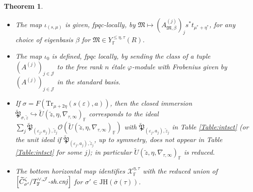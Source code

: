 \documentclass[oneside,a4paper,english, 11pt]{amsart}
\theoremstyle{plain}
\newtheorem{thm}{Theorem}[subsection]
\theoremstyle{plain}
\theoremstyle{plain}
\theoremstyle{plain}
\theoremstyle{plain}
\theoremstyle{plain}
\theoremstyle{definition}
\theoremstyle{definition}
\theoremstyle{definition}
\theoremstyle{remark}
\numberwithin{equation}{section}
\newcommand{\F}{\mathbb{F}}
\newcommand{\fM}{\mathfrak{M}}
\newcommand{\fP}{\mathfrak{P}}
\newcommand{\cJ}{\mathcal{J}}
\newcommand{\cO}{\mathcal{O}}
\newcommand{\cX}{\mathcal{X}}
\newcommand{\eps}{\varepsilon}
\newcommand{\phz}{\varphi}
\newcommand{\Tr}{\mathrm{Tr}}
\newcommand{\tld}[1]{\widetilde{#1}}
\newcommand{\JH}{\mathrm{JH}}
\newcommand{\ovl}[1]{\overline{#1}}
\newcommand{\into}{\hookrightarrow}
\begin{document}
\begin{thm}
\begin{itemize}
\[ (A^{(j)})_j \mapsto  (A^{(j)})_js^*t_{\mu^*+\eta^*}\] 
and is a locally closed immersion.
\item
The map $\iota_{(s,\mu)}$ is given, fpqc-locally, by $\fM\mapsto (A^{(j)}_{\fM,\beta})_js^*t_{\mu^*+\eta^*}$, for any choice of eigenbasis $\beta$ for $\fM\in Y^{\leq\eta,\tau}_\F(R)$.
\item
The map $\iota_0$ is defined, fpqc locally, by sending the class of a tuple $(A^{(j)})_{j\in\cJ}$ to the free rank $n$ \'etale $\phz$-module with Frobenius given by $(A^{(j)})_{j\in\cJ}$ in the standard basis.
\item
If $\sigma = F(\Tr_{\mu+2\eta}(s(\eps),a))$, then the closed immersion $\tld{\fP}_{\sigma,\tld{z}}\into \tld{U}(\tld{z},\eta,\nabla_{\tau,\infty})_{\F}$ corresponds to the ideal $\sum_j \tld{\fP}_{(\eps_j,a_j),\tld{z}_j}\cO(\tld{U}(\tld{z},\eta,\nabla_{\tau,\infty})_{\F})$ with $\tld{\fP}_{(\eps_j,a_j),\tld{z}_j}$ in Table \ref{Table:intsct} (or the unit ideal if $\tld{\fP}_{(\eps_j,a_j),\tld{z}_j}$, up to symmetry, does not appear in Table \ref{Table:intsct} for some $j$); in particular $\tld{U}(\tld{z},\eta,\nabla_{\tau,\infty})_{\F}$ is reduced.
%
\item
The bottom horizontal map identifies  $\cX^{\eta,\tau}_{\F}$ with the reduced union of $\Big[\tld{C}^\zeta_{\sigma'}/T_\F^{\vee,\cJ}\text{\emph{-sh.cnj}}\Big]$ for $\sigma'\in \JH(\ovl{\sigma}(\tau))$. %
%


\end{itemize}
%
%
%
\end{thm}
%
%
%
%
%
\end{document}
